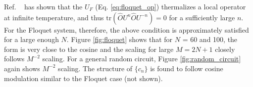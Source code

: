 \documentclass[twocolumn,superscriptaddress, prb]{revtex4-1}
\begin{document}
Ref. ~ has shown that the $U_F$ (Eq. \eqref{eq:floquet_op}) thermalizes a local operator at infinite temperature, 
and thus $\mathrm{tr}(\hat{O}U^n\hat{O}U^{-n}) = 0$ for a sufficiently large $n$. 
For the Floquet system, therefore, the above condition is approximately satisfied for a large enough $N$. 
Figure \ref{fig:floquet} shows that for $N$ = 60 and 100, the form is very close to the cosine 
and the scaling for large $M = 2N +1$ closely follows $M^{-2}$ scaling. 
For a general random circuit, Figure \ref{fig:random_circuit} again shows $M^{-2}$ scaling. The structure of $\{c_n\}$ 
is found to follow cosine modulation similar to the Floquet case (not shown).  
\end{document}
